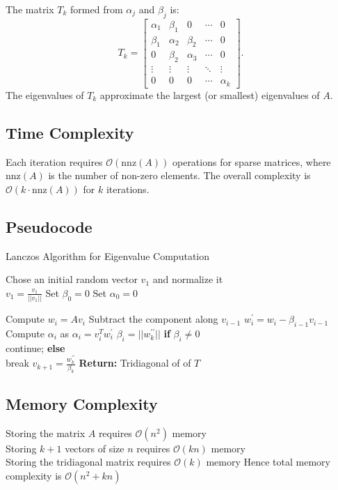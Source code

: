\documentclass[final]{article}
\begin{document}
The matrix $T_k$ formed from $\alpha_j$ and $\beta_j$ is:
\[
T_k = \begin{bmatrix}
\alpha_1 & \beta_1 & 0 & \cdots & 0 \\
\beta_1 & \alpha_2 & \beta_2 & \cdots & 0 \\
0 & \beta_2 & \alpha_3 & \cdots & 0 \\
\vdots & \vdots & \vdots & \ddots & \vdots \\
0 & 0 & 0 & \cdots & \alpha_k
\end{bmatrix}.
\]
The eigenvalues of $T_k$ approximate the largest (or smallest) eigenvalues of $A$.


\subsection{Time Complexity} Each iteration requires $\mathcal{O}(\text{nnz}(A))$ operations for sparse matrices, where $\text{nnz}(A)$ is the number of non-zero elements. The overall complexity is $\mathcal{O}(k \cdot \text{nnz}(A))$ for $k$ iterations.

\subsection{Pseudocode}
\begin{algorithm}
\caption{Lanczos Algorithm for Eigenvalue Computation}
\begin{algorithmic}

\State Chose an initial random vector $v_1$ and normalize it \\
\State $v_1 = \frac{v_1}{||v_1||}$
\State Set $ \beta_0 = 0 $
\State Set $ \alpha_0 = 0 $

    \State Compute $w_i = Av_i$
    \State Subtract the component along $v_{i-1}$ 
    \State $w^{\prime}_i = w_i - \beta_{i-1}v_{i-1}$
    \State Compute $\alpha_i$ as $\alpha_i = v_i^{T}w^{\prime}_i$
    \State $\beta_i = ||w^{\prime\prime}_k||$
    \State \textbf{if} $ \beta_i \neq 0 $\\
    \hspace{1 cm} continue;
    \State \textbf{else} \\
    \hspace{1 cm} break
    $v_{k+1} = \frac{w^{\prime\prime}_k}{\beta_k}$
\EndFor
\State \textbf{Return:} Tridiagonal of of $T$
\end{algorithmic}
\end{algorithm}

\subsection{Memory Complexity}
Storing the matrix $A$ requires $\mathcal{O}(n^2)$ memory \\
Storing $k+1$ vectors of size $n$ requires $\mathcal{O}(kn)$ memory \\
Storing the tridiagonal matrix requires $\mathcal{O}(k)$ memory
Hence total memory complexity is $\mathcal{O}(n^2+kn)$
\end{document}
